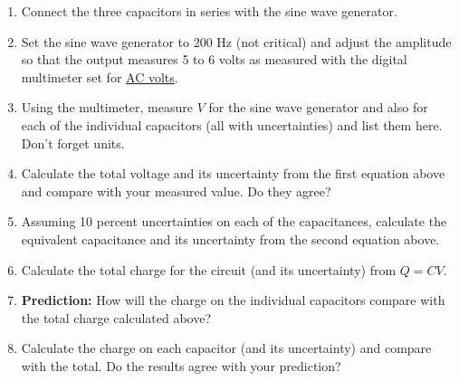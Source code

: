 \begin{enumerate}
\item Connect the three capacitors in series with the sine wave generator.
\item Set the sine wave generator to 200 Hz (not critical) and adjust the
amplitude so that the output measures 5 to 6 volts as measured with the
digital multimeter set for \underline{AC volts}.
\item Using the multimeter, measure $V$ for the sine wave generator and also
for each of the individual capacitors (all with uncertainties) and
list them here. Don't forget units.\vspace{20mm}
\item Calculate the total voltage and its uncertainty from the first equation
above and compare with your measured value.  Do they agree?\vspace{30mm}
\item Assuming 10 percent uncertainties on each of the capacitances,
calculate the equivalent capacitance and its uncertainty from the second
equation above.\vspace{30mm}
\item Calculate the total charge for the circuit (and its uncertainty) from
$Q = CV$.\vspace{30mm}
\item \textbf{Prediction:} How will the charge on the individual capacitors
compare with the total charge calculated above?\vspace{30mm}
\item Calculate the charge on each capacitor (and its uncertainty) and compare with the total.
Do the results agree with your prediction?
\end{enumerate}

